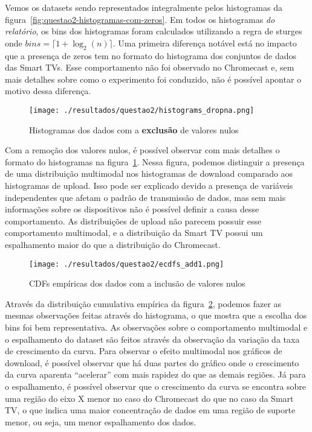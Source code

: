 \documentclass{article}
\begin{document}
Vemos os datasets sendo representados integralmente pelos histogramas da figura~\ref{fig:questao2-histogramas-com-zeros}. Em todos os histogramas \textit{do relatório}, os bins dos histogramas foram calculados utilizando a regra de sturges onde $bins=\lceil1+\log_2(n)\rceil$. Uma primeira diferença notável está no impacto que a presença de zeros tem no formato do histograma dos conjuntos de dados das Smart TVs. Esse comportamento não foi observado no Chromecast e, sem mais detalhes sobre como o experimento foi conduzido, não é possível apontar o motivo dessa diferença.

\begin{figure}[h]
	\centering
	\caption{Histogramas dos dados com a \textbf{exclusão} de valores nulos}
	\texttt{[image: ./resultados/questao2/histograms\_dropna.png]}
	\label{fig:questao2-histogramas-sem-zeros}
\end{figure}

Com a remoção dos valores nulos, é possível observar com mais detalhes o formato do histogramas na figura~\ref{fig:questao2-histogramas-sem-zeros}. Nessa figura, podemos distinguir a presença de uma distribuição multimodal nos histogramas de download comparado aos histogramas de upload. Isso pode ser explicado devido a presença de variáveis independentes que afetam o padrão de transmissão de dados, mas sem mais informações sobre os dispositivos não é possível definir a causa desse comportamento. As distribuições de upload não parecem possuir esse comportamento multimodal, e a distribuição da Smart TV possui um espalhamento maior do que a distribuição do Chromecast.



\begin{figure}[h]
	\centering
	\caption{CDFs empíricas dos dados com a inclusão de valores nulos}
	\texttt{[image: ./resultados/questao2/ecdfs\_add1.png]}
	\label{fig:questao2-ecdf}
\end{figure}

Através da distribuição cumulativa empírica da figura~\ref{fig:questao2-ecdf}, podemos fazer as mesmas observações feitas através do histograma, o que mostra que a escolha dos bins foi bem representativa. As observações sobre o comportamento multimodal e o espalhamento do dataset são feitos através da observação da variação da taxa de crescimento da curva. Para observar o efeito multimodal nos gráficos de download, é possível observar que há duas partes do gráfico onde o crescimento da curva aparenta ``acelerar'' com mais rapidez do que as demais regiões. Já para o espalhamento, é possível observar que o crescimento da curva se encontra sobre uma região do eixo X menor no caso do Chromecast do que no caso da Smart TV, o que indica uma maior concentração de dados em uma região de suporte menor, ou seja, um menor espalhamento dos dados.
\end{document}
